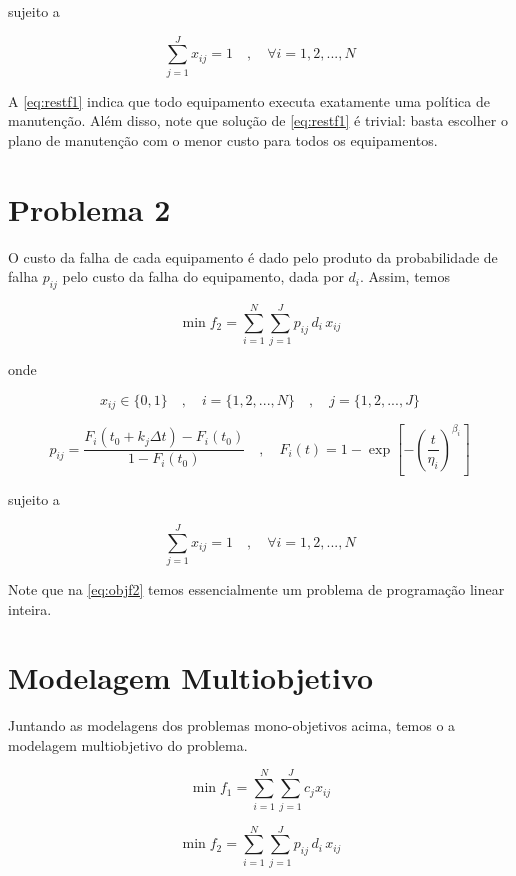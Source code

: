 \documentclass[
	12pt,				%
	oneside,			%
	a4paper,			%
	chapter=TITLE,
	sumario=tradicional,
	english,			%
	brazil				%
]{abntex2}
\begin{document}
\noindent sujeito a 

\begin{equation}\label{eq:restf1}
	\sum_{j=1}^{J} x_{ij} = 1 \quad , \quad \forall i = {1, 2, ..., N}
\end{equation}

A \autoref{eq:restf1} indica que todo equipamento executa exatamente uma política de manutenção.
Além disso, note que solução de \autoref{eq:restf1} é trivial: basta escolher o plano de 
manutenção com o menor custo para todos os equipamentos.

\section{Problema 2}

O custo da falha de cada equipamento é dado pelo produto da probabilidade de falha $p_{ij}$ pelo custo da falha do equipamento,
dada por $d_i$. Assim, temos 

\begin{equation}\label{eq:objf2}
	\min f_2 = \sum_{i=1}^{N} \sum_{j=1}^{J} p_{ij} \, d_i \, x_{ij}
\end{equation}

\noindent onde 

\[ x_{ij} \in \{0,1\} \quad , \quad i = \{1, 2, ..., N\}  \quad , \quad j = \{1, 2, ..., J\} \]

\[ 
p_{ij} = \frac{F_i \left(t_0 + k_j \Delta t \right) - F_i\left(t_0\right) }{1 - F_i\left(t_0\right)}
\quad , \quad 
F_i(t) = 1 - \exp \left[ - \left( \frac{t}{\eta_i} \right)^{\beta_i} \right] 
\]

\noindent sujeito a 

\begin{equation}\label{eq:restf2}
	\sum_{j=1}^{J} x_{ij} = 1 \quad , \quad \forall i = {1, 2, ..., N}
\end{equation}

Note que na \autoref{eq:objf2} temos essencialmente um problema de programação linear inteira.

\section{Modelagem Multiobjetivo}

Juntando as modelagens dos problemas mono-objetivos acima, temos o 
a modelagem multiobjetivo do problema.

\[  \min f_1 = \sum_{i=1}^{N} \sum_{j=1}^{J} c_j x_{ij} \]

\[  \min f_2 = \sum_{i=1}^{N} \sum_{j=1}^{J} p_{ij} \, d_i \, x_{ij} \]
\end{document}
